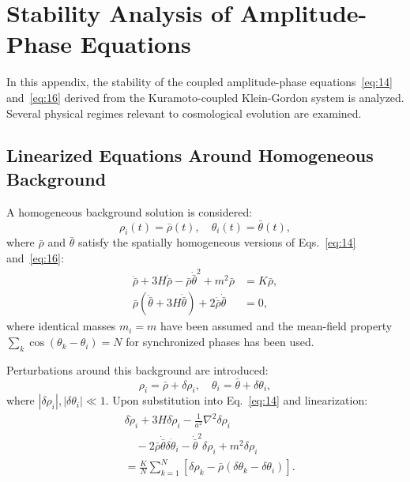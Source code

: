 
\section{Stability Analysis of Amplitude-Phase Equations}
\label{app:stability}

In this appendix, the stability of the coupled amplitude-phase equations~\eqref{eq:14} and~\eqref{eq:16} derived from the Kuramoto-coupled Klein-Gordon system is analyzed.
Several physical regimes relevant to cosmological evolution are examined.

\subsection{Linearized Equations Around Homogeneous Background}

A homogeneous background solution is considered:
\begin{equation}
\rho_i(t) = \bar{\rho}(t), \quad \theta_i(t) = \bar{\theta}(t),
\label{eq:background}
\end{equation}
where $\bar{\rho}$ and $\bar{\theta}$ satisfy the spatially homogeneous versions of Eqs.~\eqref{eq:14} and~\eqref{eq:16}:
\begin{align}
\ddot{\bar{\rho}} + 3H\dot{\bar{\rho}} - \bar{\rho}\dot{\bar{\theta}}^2 + m^2\bar{\rho} &= K\bar{\rho}, \label{eq:bg_rho} \\
\bar{\rho}(\ddot{\bar{\theta}} + 3H\dot{\bar{\theta}}) + 2\dot{\bar{\rho}}\dot{\bar{\theta}} &= 0, \label{eq:bg_theta}
\end{align}
where identical masses $m_i = m$ have been assumed and the mean-field property $\sum_k \cos(\theta_k - \theta_i) = N$ for synchronized phases has been used.

Perturbations around this background are introduced:
\begin{equation}
\rho_i = \bar{\rho} + \delta\rho_i, \quad \theta_i = \bar{\theta} + \delta\theta_i,
\end{equation}
where $|\delta\rho_i|, |\delta\theta_i| \ll 1$. Upon substitution into Eq.~\eqref{eq:14} and linearization:
\begin{align}
&\delta\ddot{\rho}_i + 3H\delta\dot{\rho}_i - \frac{1}{a^2}\nabla^2\delta\rho_i \nonumber \\
&\quad - 2\bar{\rho}\dot{\bar{\theta}}\delta\dot{\theta}_i - \dot{\bar{\theta}}^2\delta\rho_i + m^2\delta\rho_i \nonumber \\
&= \frac{K}{N}\sum_{k=1}^N \left[\delta\rho_k - \bar{\rho}(\delta\theta_k - \delta\theta_i)\right].
\label{eq:lin_rho}
\end{align}

